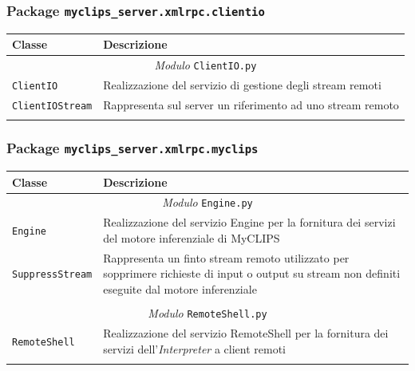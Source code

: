 \subsubsection{Package \texttt{myclips\_server.xmlrpc.clientio}}

\begin{longtable}{p{5.5cm}p{6.5cm}}
\hline 
\textbf{Classe} & \textbf{Descrizione} \\ 
\hline\hline 
\endhead

\multicolumn{2}{c}{\emph{Modulo} \texttt{ClientIO.py}}\\
	\hdashline[5pt/5pt]
		\texttt{ClientIO} & Realizzazione del servizio di gestione degli stream remoti \\ 
	\hdashline[1pt/5pt]
		\texttt{ClientIOStream} & Rappresenta sul server un riferimento ad uno stream remoto \\ 
	\hline\\

\end{longtable}

\subsubsection{Package \texttt{myclips\_server.xmlrpc.myclips}}

\begin{longtable}{p{5.5cm}p{6.5cm}}
\hline 
\textbf{Classe} & \textbf{Descrizione} \\ 
\hline\hline 
\endhead

\multicolumn{2}{c}{\emph{Modulo} \texttt{Engine.py}}\\
	\hdashline[5pt/5pt]
		\texttt{Engine} & Realizzazione del servizio Engine per la fornitura dei servizi del motore inferenziale di MyCLIPS \\ 
	\hdashline[1pt/5pt]
		\texttt{SuppressStream} & Rappresenta un finto stream remoto utilizzato per sopprimere richieste di input o output su stream non definiti eseguite dal motore inferenziale\\ 
	\hline\\

\multicolumn{2}{c}{\emph{Modulo} \texttt{RemoteShell.py}}\\
	\hdashline[5pt/5pt]
		\texttt{RemoteShell} & Realizzazione del servizio RemoteShell per la fornitura dei servizi dell'\emph{Interpreter} a client remoti \\ 
	\hline\\


\end{longtable}


